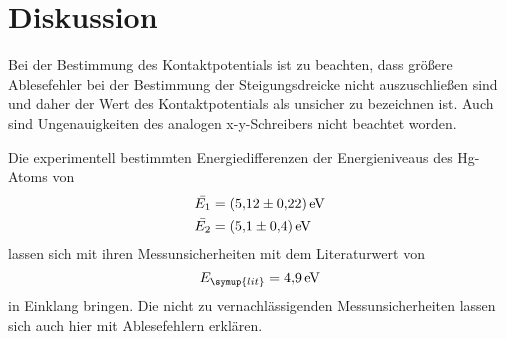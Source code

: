 \section{Diskussion}
\label{sec:Diskussion}
Bei der Bestimmung des Kontaktpotentials ist zu beachten, dass größere Ablesefehler bei der Bestimmung der Steigungsdreicke nicht
auszuschließen sind und daher der Wert des Kontaktpotentials als unsicher zu bezeichnen ist. Auch sind Ungenauigkeiten des analogen 
x-y-Schreibers nicht beachtet worden.

Die experimentell bestimmten Energiedifferenzen der Energieniveaus des Hg-Atoms von
\begin{align*}
    \bar{E_1}&=\qty{5.12+-0.22}{\electronvolt} \\
    \bar{E_2}&=\qty{5.1+-0.4}{\electronvolt}
\end{align*}
lassen sich mit ihren Messunsicherheiten mit dem Literaturwert von
\begin{equation*}
    E_{\symup{lit}} = \qty{4,9}{\electronvolt}
\end{equation*}
in Einklang bringen. Die nicht zu vernachlässigenden Messunsicherheiten lassen sich auch hier mit Ablesefehlern erklären.